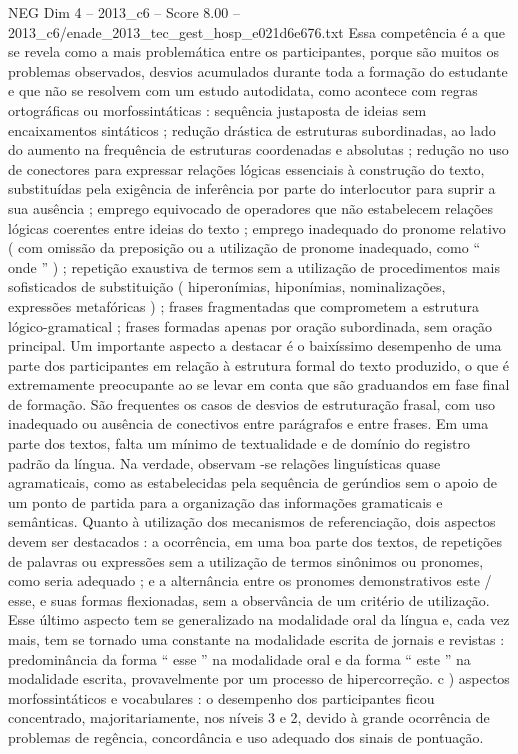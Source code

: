 \begin{textsample}{NEG Dim 4 – 2013\_c6 – Score 8.00 – 2013\_c6/enade\_2013\_tec\_gest\_hosp\_e021d6e676.txt}
Essa competência é a que se revela como a mais problemática entre os participantes, porque são muitos os problemas observados, desvios acumulados durante toda a formação do estudante e que não se resolvem com um estudo autodidata, como acontece com regras ortográficas ou morfossintáticas : sequência justaposta de ideias sem encaixamentos sintáticos ; redução drástica de estruturas subordinadas, ao lado do aumento na frequência de estruturas coordenadas e absolutas ; redução no uso de conectores para expressar relações lógicas essenciais à construção do texto, substituídas pela exigência de inferência por parte do interlocutor para suprir a sua ausência ; emprego equivocado de operadores que não estabelecem relações lógicas coerentes entre ideias do texto ; emprego inadequado do pronome relativo ( com omissão da preposição ou a utilização de pronome inadequado, como “ onde ” ) ; repetição exaustiva de termos sem a utilização de procedimentos mais sofisticados de substituição ( hiperonímias, hiponímias, nominalizações, expressões metafóricas ) ; frases fragmentadas que comprometem a estrutura lógico-gramatical ; frases formadas apenas por oração subordinada, sem oração principal.
Um importante aspecto a destacar é o baixíssimo desempenho de uma parte dos participantes em relação à estrutura formal do texto produzido, o que é extremamente preocupante ao se levar em conta que são graduandos em fase final de formação.
São frequentes os casos de desvios de estruturação frasal, com uso inadequado ou ausência de conectivos entre parágrafos e entre frases.
Em uma parte dos textos, falta um mínimo de textualidade e de domínio do registro padrão da língua.
Na verdade, observam -se relações linguísticas quase agramaticais, como as estabelecidas pela sequência de gerúndios sem o apoio de um ponto de partida para a organização das informações gramaticais e semânticas.
Quanto à utilização dos mecanismos de referenciação, dois aspectos devem ser destacados : a ocorrência, em uma boa parte dos textos, de repetições de palavras ou expressões sem a utilização de termos sinônimos ou pronomes, como seria adequado ; e a alternância entre os pronomes demonstrativos este / esse, e suas formas flexionadas, sem a observância de um critério de utilização.
Esse último aspecto tem se generalizado na modalidade oral da língua e, cada vez mais, tem se tornado uma constante na modalidade escrita de jornais e revistas : predominância da forma “ esse ” na modalidade oral e da forma “ este ” na modalidade escrita, provavelmente por um processo de hipercorreção. c ) aspectos morfossintáticos e vocabulares : o desempenho dos participantes ficou concentrado, majoritariamente, nos níveis 3 e 2, devido à grande ocorrência de problemas de regência, concordância e uso adequado dos sinais de pontuação.

\end{textsample}
